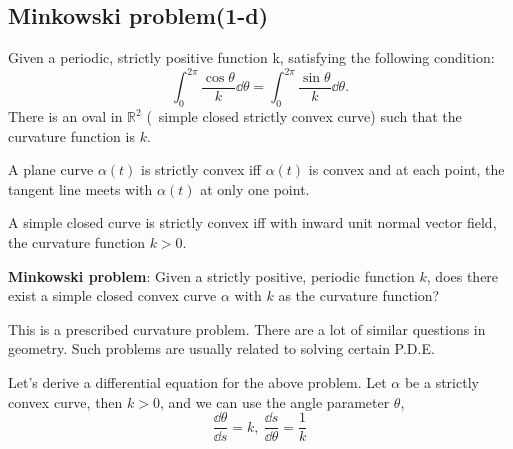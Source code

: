 \subsection{Minkowski problem(1-d)}
\begin{theorem}
    \label{thm: Minkowski problem}
    Given a periodic, strictly positive function k, satisfying the following condition:
    \[\int_0^{2\pi}\frac{\cos \theta}{k}\dd \theta=
    \int_0^{2\pi}\frac{\sin \theta}{k}\dd \theta
    .\]
    There is an oval in 
    $\mathbb{R}^2$ (\ie\ simple closed strictly convex curve) such that 
    the curvature function is $k$. 
\end{theorem}
\begin{definition}
    A plane curve $\alpha(t)$ is strictly convex iff $\alpha(t)$ is convex 
    and at each point, the tangent line meets with $\alpha(t)$ at only 
    one point.
\end{definition}
\begin{proposition}
    A simple closed curve is strictly convex iff with inward unit normal 
    vector field, the curvature function $k>0$. 
\end{proposition}
\textbf{Minkowski problem}: Given a strictly positive, periodic function
$k$, does there exist a simple closed convex curve $\alpha$ with $k$
as the curvature function?
\begin{remark}
    This is a prescribed curvature problem. There are a lot of similar 
    questions in geometry. Such problems are usually related to solving
    certain P.D.E.
\end{remark}
Let's derive a differential equation for the above problem. Let $\alpha$ be 
a strictly convex curve, then $k>0$, and we can use the angle parameter $\theta$, \ie\ 
\[\frac{\dd\theta}{\dd s}=k,~\frac{\dd s}{\dd \theta}=\frac{1}{k} \]
\begin{center}
\end{center}
